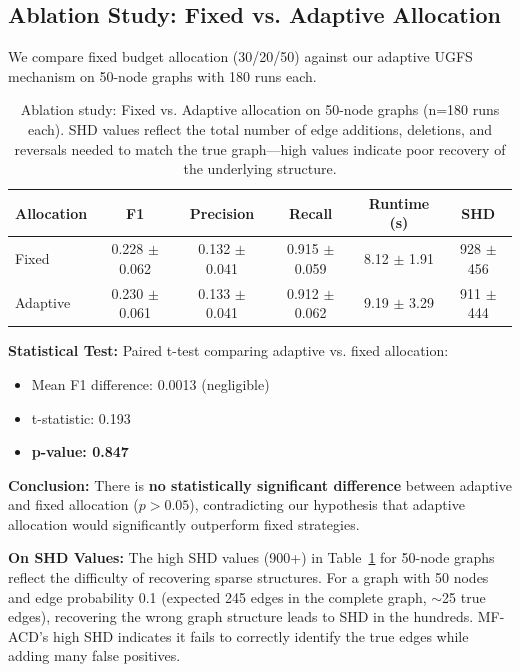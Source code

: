 \documentclass{article}
\begin{document}
\subsection{Ablation Study: Fixed vs. Adaptive Allocation}

We compare fixed budget allocation (30/20/50) against our adaptive UGFS mechanism on 50-node graphs with 180 runs each.

\begin{table}[t]
\caption{Ablation study: Fixed vs. Adaptive allocation on 50-node graphs (n=180 runs each). SHD values reflect the total number of edge additions, deletions, and reversals needed to match the true graph---high values indicate poor recovery of the underlying structure.}
\label{tab:ablation}
\centering
\begin{tabular}{lccccc}
\toprule
Allocation & F1 & Precision & Recall & Runtime (s) & SHD \\
\midrule
Fixed & 0.228 $\pm$ 0.062 & 0.132 $\pm$ 0.041 & 0.915 $\pm$ 0.059 & 8.12 $\pm$ 1.91 & 928 $\pm$ 456 \\
Adaptive & 0.230 $\pm$ 0.061 & 0.133 $\pm$ 0.041 & 0.912 $\pm$ 0.062 & 9.19 $\pm$ 3.29 & 911 $\pm$ 444 \\
\bottomrule
\end{tabular}
\end{table}

\textbf{Statistical Test:} Paired t-test comparing adaptive vs. fixed allocation:
\begin{itemize}
    \item Mean F1 difference: 0.0013 (negligible)
    \item t-statistic: 0.193
    \item \textbf{p-value: 0.847}
\end{itemize}

\textbf{Conclusion:} There is \textbf{no statistically significant difference} between adaptive and fixed allocation ($p > 0.05$), contradicting our hypothesis that adaptive allocation would significantly outperform fixed strategies.

\textbf{On SHD Values:} The high SHD values (900+) in Table~\ref{tab:ablation} for 50-node graphs reflect the difficulty of recovering sparse structures. For a graph with 50 nodes and edge probability 0.1 (expected 245 edges in the complete graph, $\sim$25 true edges), recovering the wrong graph structure leads to SHD in the hundreds. MF-ACD's high SHD indicates it fails to correctly identify the true edges while adding many false positives.
\end{document}
